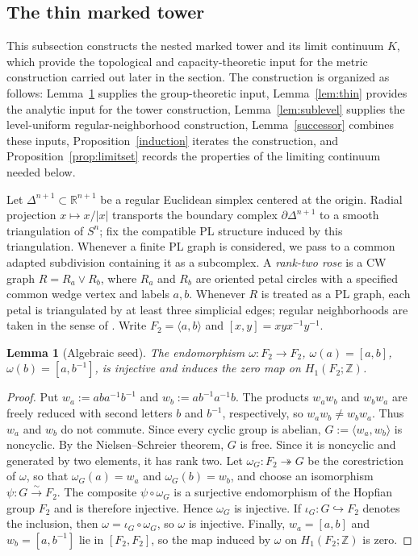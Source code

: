 \documentclass[12pt,oneside,a4paper]{article}
\theoremstyle{mytheorem}
\newtheorem{lemma}[definition]{Lemma}
\theoremstyle{remark}
\theoremstyle{definition}
\begin{document}
\subsection{The thin marked tower}

This subsection constructs the nested marked tower and its limit
continuum \(K\), which provide the topological and capacity-theoretic
input for the metric construction carried out later in the section.
The construction is organized as follows:
Lemma~\ref{lem:endo} supplies the group-theoretic input,
Lemma~\ref{lem:thin} provides the analytic input for the tower construction,
Lemma~\ref{lem:sublevel} supplies the level-uniform regular-neighborhood
construction,
Lemma~\ref{successor} combines these inputs,
Proposition~\ref{induction} iterates the construction, and
Proposition~\ref{prop:limitset} records the properties of the limiting
continuum needed below.

Let $\Delta^{n+1}\subset\mathbb R^{n+1}$ be a regular Euclidean simplex
centered at the origin.  Radial projection
$x\mapsto x/|x|$ transports the boundary complex
$\partial\Delta^{n+1}$ to a smooth triangulation of $S^n$; fix the
compatible PL structure induced by this triangulation.  Whenever a
finite PL graph is considered, we pass to a common
adapted subdivision containing it as a subcomplex.  A \emph{rank-two rose} is
a CW graph $R=R_a\vee R_b$, where $R_a$ and $R_b$ are oriented petal
circles with a specified common wedge vertex and labels $a,b$.  Whenever
$R$ is treated as a PL graph, each petal is triangulated by at least three
simplicial edges; regular neighborhoods are taken in the sense of
\cite[\S3]{zbMATH01714503}.  Write $F_2=\langle a,b\rangle$ and
$[x,y]=xyx^{-1}y^{-1}$.


\begin{lemma}[Algebraic seed]\label{lem:endo}
The endomorphism $\omega:F_2\to F_2$,
$\omega(a)=[a,b]$, $\omega(b)=[a,b^{-1}]$, is injective and
induces the zero map on $H_1(F_2;\mathbb{Z})$.
\end{lemma}

\begin{proof}
Put $w_a:=aba^{-1}b^{-1}$ and $w_b:=ab^{-1}a^{-1}b$.  The products
$w_aw_b$ and $w_bw_a$ are freely reduced with second letters $b$ and
$b^{-1}$, respectively, so $w_aw_b\ne w_bw_a$.  Thus $w_a$ and $w_b$ do
not commute.  Since every cyclic group is abelian,
$G:=\langle w_a,w_b\rangle$ is noncyclic.
By the Nielsen--Schreier theorem, $G$ is free.  Since it is noncyclic and
generated by two elements, it has rank two.  Let
$\omega_G:F_2\twoheadrightarrow G$ be the corestriction of $\omega$,
so that $\omega_G(a)=w_a$ and $\omega_G(b)=w_b$,
and choose an isomorphism $\psi:G\xrightarrow{\sim}F_2$.  The composite
$\psi\circ\omega_G$ is a surjective endomorphism of the Hopfian group
$F_2$ and is therefore injective.  Hence $\omega_G$ is injective.  If
$\iota_G:G\hookrightarrow F_2$ denotes the inclusion, then
$\omega=\iota_G\circ\omega_G$, so $\omega$ is injective.  Finally,
$w_a=[a,b]$ and $w_b=[a,b^{-1}]$ lie in $[F_2,F_2]$, so the map
induced by $\omega$ on $H_1(F_2;\mathbb Z)$ is zero.
\end{proof}
\end{document}
